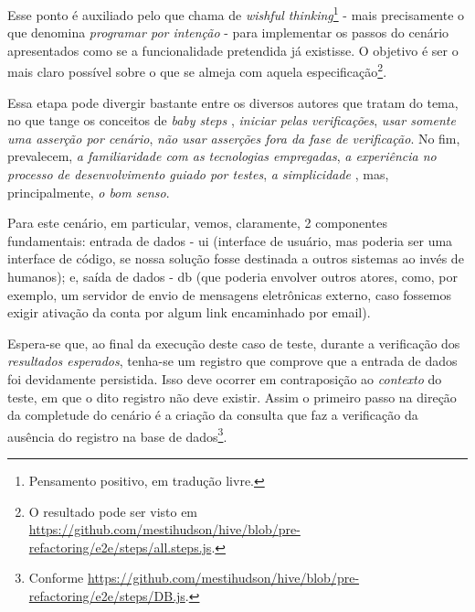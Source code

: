   Esse ponto é auxiliado pelo que  chama de \emph{wishful thinking}\footnote{Pensamento positivo, em tradução livre.} - mais precisamente o que  denomina \emph{programar por intenção} - para implementar os passos do cenário apresentados como se a funcionalidade pretendida já existisse. O objetivo é ser o mais claro possível sobre o que se almeja com aquela especificação\footnote{O resultado pode ser visto em \url{https://github.com/mestihudson/hive/blob/pre-refactoring/e2e/steps/all.steps.js}.}.

  Essa etapa pode divergir bastante entre os diversos autores que tratam do tema, no que tange os conceitos de \emph{baby steps} \cite[pág. 1]{Aniche2011}, \emph{iniciar pelas verificações}, \emph{usar somente uma asserção por cenário}, \emph{não usar asserções fora da fase de verificação}. No fim, prevalecem, \emph{a familiaridade com as tecnologias empregadas}, \emph{a experiência no processo de desenvolvimento guiado por testes}, \emph{a simplicidade} \cite[pág. xii]{Beck2003}, mas, principalmente, \emph{o bom senso}.


  Para este cenário, em particular, vemos, claramente, 2 componentes fundamentais: entrada de dados - ui (interface de usuário, mas poderia ser uma interface de código, se nossa solução fosse destinada a outros sistemas ao invés de humanos); e, saída de dados - db (que poderia envolver outros atores, como, por exemplo, um servidor de envio de mensagens eletrônicas externo, caso fossemos exigir ativação da conta por algum link encaminhado por email).

  Espera-se que, ao final da execução deste caso de teste, durante a verificação dos \emph{resultados esperados}, tenha-se um registro que comprove que a entrada de dados foi devidamente persistida. Isso deve ocorrer em contraposição ao \emph{contexto} do teste, em que o dito registro não deve existir. Assim o primeiro passo na direção da completude do cenário é a criação da consulta que faz a verificação da ausência do registro na base de dados\footnote{Conforme \url{https://github.com/mestihudson/hive/blob/pre-refactoring/e2e/steps/DB.js}.}.

